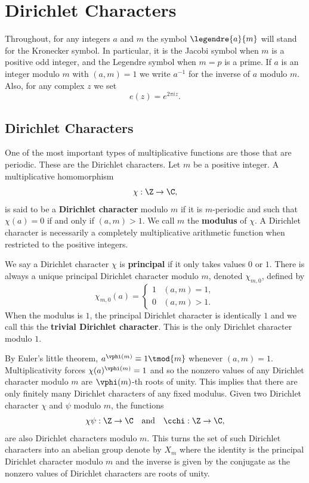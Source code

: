 \documentclass[12pt]{article}
\begin{document}
  \section{Dirichlet Characters}
    Throughout, for any integers \(a\) and \(m\) the symbol \(\legendre{a}{m}\) will stand for the Kronecker symbol. In particular, it is the Jacobi symbol when \(m\) is a positive odd integer, and the Legendre symbol when \(m = p\) is a prime. If \(a\) is an integer modulo \(m\) with \((a,m) = 1\) we write \(a^{-1}\) for the inverse of \(a\) modulo \(m\). Also, for any complex \(z\) we set
    \[
      e(z) = e^{2\pi iz}.
    \]
    \subsection{Dirichlet Characters}
      One of the most important types of multiplicative functions are those that are periodic. These are the Dirichlet characters. Let \(m\) be a positive integer. A multiplicative homomorphism
      \[
        \chi:\Z \to \C,
      \]
      is said to be a \textbf{Dirichlet character} modulo \(m\) if it is \(m\)-periodic and such that \(\chi(a) = 0\) if and only if \((a,m) > 1\). We call \(m\) the \textbf{modulus} of \(\chi\). A Dirichlet character is necessarily a completely multiplicative arithmetic function when restricted to the positive integers.
      
      We say a Dirichlet character \(\chi\) is \textbf{principal} if it only takes values \(0\) or \(1\). There is always a unique principal Dirichlet character modulo \(m\), denoted \(\chi_{m,0}\), defined by
      \[
        \chi_{m,0}(a) = \begin{cases} 1 & (a,m) = 1, \\ 0 & (a,m) > 1. \end{cases}
      \]
      When the modulus is \(1\), the principal Dirichlet character is identically \(1\) and we call this the \textbf{trivial Dirichlet character}. This is the only Dirichlet character modulo \(1\).
      
      By Euler's little theorem, \(a^{\vphi(m)} \equiv 1 \tmod{m}\) whenever \((a,m) = 1\). Multiplicativity forces \(\chi(a)^{\vphi(m)} = 1\) and so the nonzero values of any Dirichlet character modulo \(m\) are \(\vphi(m)\)-th roots of unity. This implies that there are only finitely many Dirichlet characters of any fixed modulus. Given two Dirichlet character \(\chi\) and \(\psi\) modulo \(m\), the functions
      \[
        \chi\psi:\Z \to \C \quad \text{and} \quad \cchi:\Z \to \C,
      \]
      are also Dirichlet characters modulo \(m\). This turns the set of such Dirichlet characters into an abelian group denote by \(X_{m}\) where the identity is the principal Dirichlet character modulo \(m\) and the inverse is given by the conjugate as the nonzero values of Dirichlet characters are roots of unity.
      
\end{document}
